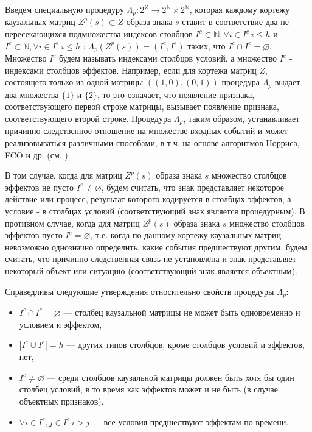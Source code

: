 \documentclass[12pt]{scrartcl}
\begin{document}
	Введем специальную процедуру $\Lambda_p: 2^Z\rightarrow 2^{\mathbb N}\times 2^{\mathbb N}$, которая каждому кортежу каузальных матриц $Z^p(s)\subset Z$ образа знака $s$ ставит в соответствие два не пересекающихся подмножества индексов столбцов $I^c\subset\mathbb N, \forall i\in I^c\ i\leq h$ и $I^e\subset\mathbb N, \forall i\in I^e\ i\leq h$ : $\Lambda_p(Z^p(s))=(I^c,I^e)$ таких, что $I^c\cap I^e=\varnothing$. Множество $I^c$ будем называть индексами столбцов условий, а множество $I^e$ - индексами столбцов эффектов. Например, если для кортежа матриц $Z$, состоящего только из одной матрицы $((1, 0), (0, 1))$ процедура $\Lambda_p$ выдает два множества $\{1\}$ и $\{2\}$, то это означает, что появление признака, соответствующего первой строке матрицы, вызывает появление признака, соответствующего второй строке. Процедура $\Lambda_p$, таким образом, устанавливает причинно-следственное отношение на множестве входных событий и может реализовываться различными способами, в т.ч. на основе алгоритмов Норриса, FCO и др. (см. \cite{Kuznetsov2001,Kuznetsov1996})

	В том случае, когда для матриц $Z^p(s)$ образа знака $s$ множество столбцов эффектов не пусто $I^e \not=\varnothing$, будем считать, что знак представляет некоторое действие или процесс, результат которого кодируется в столбцах эффектов, а условие - в столбцах условий (соответствующий знак является процедурным). В противном случае, когда для матриц $Z^p(s)$ образа знака $s$ множество столбцов эффектов пусто $I^e=\varnothing$, т.е. когда по данному кортежу каузальных матриц невозможно однозначно определить, какие события предшествуют другим, будем считать, что причинно-следственная связь не установлена и знак представляет некоторый объект или ситуацию (соответствующий знак является объектным). 

	
	Справедливы следующие утверждения относительно свойств процедуры $\Lambda_p$:
	\begin{itemize}
		\item $I^c\cap I^e=\varnothing$ --- столбец каузальной матрицы не может быть одновременно и условием и эффектом,
		\item $|I^c\cup I^e|=h$ --- других типов столбцов, кроме столбцов условий и эффектов, нет,
		\item $I^c\not = \varnothing$ --- среди столбцов каузальной матрицы должен быть хотя бы один столбец условий, в то время как эффектов может и не быть (в случае объектных признаков),
		\item $\forall i\in I^e, j\in I^c\ i>j$ --- все условия предшествуют эффектам по времени.
	\end{itemize}
	
\end{document}

